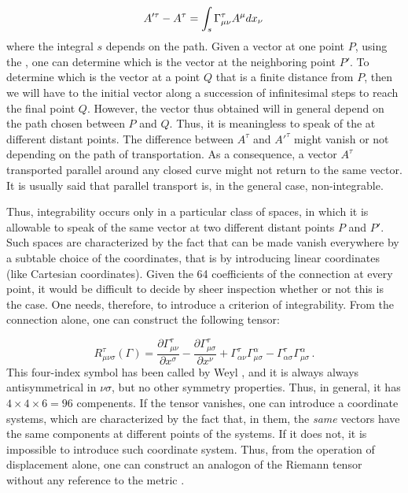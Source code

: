 \documentclass[submitted]{article}
\begin{document}
\begin{equation*}
A'^{\tau}-A^{\tau}=\int_{s} \Gamma^\tau_{\mu\nu} A^{\mu} d x_{\nu}\,
\end{equation*}
%
where the integral $s$ depends on the path. Given a vector at one point $P$, using the \Gtmn, one can determine which is the  vector at the neighboring point $P'$. To determine which is the  vector at a point $Q$ that is a finite distance from $P$, then we will have to  the initial vector along a succession of infinitesimal steps to reach the final point $Q$. However, the vector thus obtained will in general depend on the path chosen between $P$ and $Q$. Thus, it is meaningless to speak of the  at different distant points. The difference between $A^\tau$ and $A'^\tau$ might vanish or not depending on the path of transportation. As a consequence, a vector $A^\tau$ transported parallel around any closed curve might not return to the same vector. It is usually said that parallel transport is, in the general case, non-integrable. 

Thus, integrability occurs only in a particular class of spaces, in which it is allowable to speak of the same vector at two different distant points $P$ and $P'$. Such spaces are characterized by the fact that \Gtmn can be made vanish everywhere by a subtable choice of the coordinates, that is by introducing linear coordinates (like Cartesian coordinates). Given the 64 coefficients of the connection \Gtmn at every point, it would be difficult to decide by sheer inspection whether or not this is the case. One needs, therefore, to introduce a criterion of integrability. From the connection alone, one can construct the following tensor:

\begin{equation}\label{eq:riemanntensorgamma}
R_{\mu \nu \sigma}^{\tau}(\Gamma)=\frac{\partial \Gamma_{\mu \nu}^{\tau}}{\partial x^{\sigma}}-\frac{\partial \Gamma_{\mu \sigma}^{\tau}}{\partial x^{\nu}}+\Gamma_{\alpha \nu}^{\tau} \Gamma_{\mu \sigma}^{\alpha}-\Gamma_{\alpha \sigma}^{\tau} \Gamma_{\mu\sigma}^{\alpha}\,.	
\end{equation}
%
This four-index symbol has been called by Weyl , and it is always always antisymmetrical in $\nu\sigma$, but no other symmetry properties. Thus, in general, it has $4 \times 4 \times 6=96$ compenents. If the tensor \ritea vanishes, one can introduce a  coordinate systems, which are characterized by the fact that, in them, the \emph{same} vectors have the same components at different points of the systems. If it does not, it is impossible to introduce such  coordinate system. Thus, from the operation of displacement alone, one can construct an analogon of the Riemann tensor \riteg without any reference to the metric \gmn.
\end{document}
